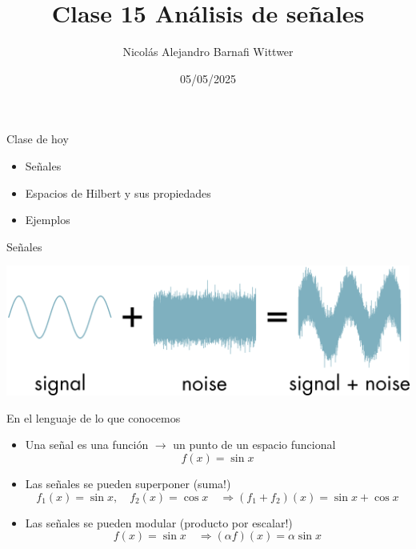 \documentclass[12pt,aspectratio=169,xcolor=dvipsnames]{beamer}
\title[short title]{Clase 15 Análisis de señales}
\subtitle{}
\author[NA Barnafi] {Nicolás Alejandro Barnafi Wittwer}
\institute[UC|CMM] 
{
    Pontificia Universidad Católica de Chile \\
    Centro de Modelamiento Matemático
}
\date{05/05/2025}
\begin{document}
\begin{frame}
    \maketitle
\end{frame}
\begin{frame}{Clase de hoy}
    \begin{itemize}
        \item Señales
        \item Espacios de Hilbert y sus propiedades
        \item Ejemplos
    \end{itemize}

    \vspace{1cm}
\end{frame}
\begin{frame}{Señales}
    \begin{center}
        \includegraphics[width=\textwidth]{../images/s2n.png}
    \end{center}
\end{frame}
\begin{frame}{En el lenguaje de lo que conocemos}
    \begin{itemize}
        \item<+-> Una señal es una función $\to$ un punto de un espacio funcional
            $$ f(x) = \sin x $$
        \item<+-> Las señales se pueden superponer (suma!)
            $$ f_1(x)=\sin x, \quad f_2(x) = \cos x \quad \Rightarrow (f_1+f_2)(x) = \sin x + \cos x$$
        \item<+-> Las señales se pueden modular (producto por escalar!)
            $$ f(x) = \sin x \quad \Rightarrow (\alpha f)(x) = \alpha \sin x $$
    \end{itemize}
\end{frame}
\end{document}
